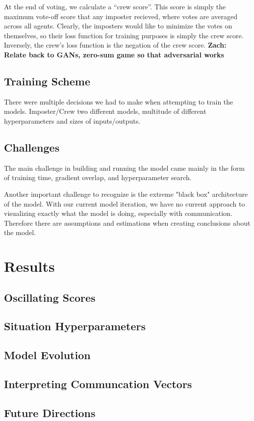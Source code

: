 \documentclass[10pt,twocolumn,letterpaper]{article}
\begin{document}
At the end of voting, we calculate a ``crew score''. This score is simply the
maximum vote-off score that any imposter recieved, where votes
are averaged across all agents. Clearly, the imposters would like to minimize the
votes on themselves, so their loss function for training purposes is
simply the crew score. Inversely, the crew's loss function is the negation of
the crew score.
\textbf{Zach: Relate back to GANs, zero-sum game so that adversarial works}
\subsection{Training Scheme}
There were multiple decisions we had to make when attempting to train the models.
Imposter/Crew two different models, multitude of different hyperparameters and
sizes of inputs/outputs.
\subsection{Challenges}
The main challenge in building and running the model
came mainly in the form of training time, gradient overlap, 
and hyperparameter search.

Another important challenge to recognize is the extreme "black box" architecture
of the model. With our current model iteration, we have no current approach to visualizing
exactly what the model is doing, especially with communication. Therefore there are
assumptions and estimations when creating conclusions about the model.

\section{Results}
\subsection{Oscillating Scores}
\subsection{Situation Hyperparameters}
\subsection{Model Evolution}
\subsection{Interpreting Communcation Vectors}
\subsection{Future Directions}


{\small


}
\end{document}

